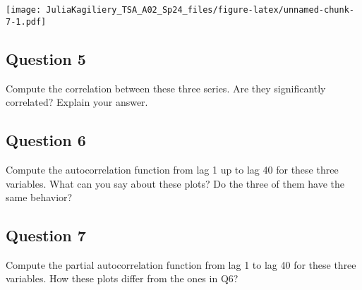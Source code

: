 \documentclass[
]{article}
\begin{document}
\texttt{[image: JuliaKagiliery\_TSA\_A02\_Sp24\_files/figure-latex/unnamed-chunk-7-1.pdf]}

\hypertarget{question-5}{%
\subsection{Question 5}\label{question-5}}

Compute the correlation between these three series. Are they
significantly correlated? Explain your answer.

\hypertarget{question-6}{%
\subsection{Question 6}\label{question-6}}

Compute the autocorrelation function from lag 1 up to lag 40 for these
three variables. What can you say about these plots? Do the three of
them have the same behavior?

\hypertarget{question-7}{%
\subsection{Question 7}\label{question-7}}

Compute the partial autocorrelation function from lag 1 to lag 40 for
these three variables. How these plots differ from the ones in Q6?
\end{document}

